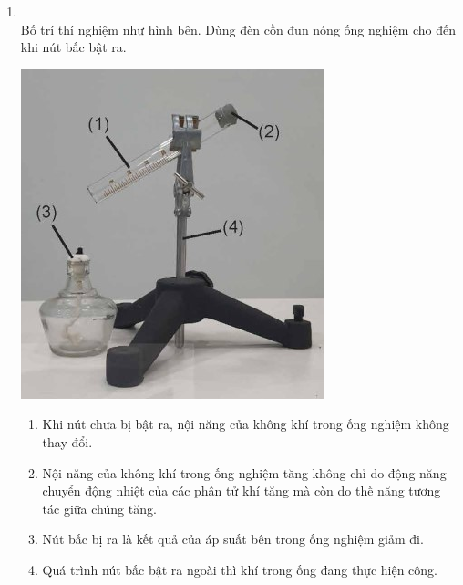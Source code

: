 \begin{enumerate}[label=\bfseries Câu \arabic*:, leftmargin=1.7cm]
\item {}\\
Bố trí thí nghiệm như hình bên. Dùng đèn cồn đun nóng ống nghiệm cho đến khi nút bấc bật ra.
\begin{center}
	\includegraphics[width=0.3\linewidth]{../figs/VN12-Y24-PH-SYL-003P-5}
\end{center}
\begin{enumerate}[label=\alph*)]
	\item Khi nút chưa bị bật ra, nội năng của không khí trong ống nghiệm không thay đổi.
	\item Nội năng của không khí trong ống nghiệm tăng không chỉ do động năng chuyển động nhiệt của các phân tử khí tăng mà còn do thế năng tương tác giữa chúng tăng.
	\item Nút bấc bị ra là kết quả của áp suất bên trong ống nghiệm giảm đi.
	\item Quá trình nút bấc bật ra ngoài thì khí trong ống đang thực hiện công.
\end{enumerate}
	

\end{enumerate}
